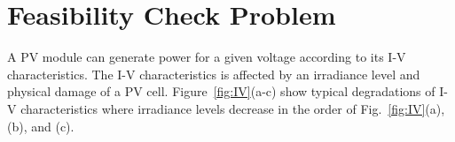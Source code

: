 \documentclass[conference]{IEEEtran}
\begin{document}






\section{Feasibility Check Problem}\label{Sec4}
A PV module can generate power for a given voltage according to its I-V characteristics. The I-V characteristics is affected by an irradiance level and physical damage of a PV cell. Figure~\ref{fig:IV}(a-c) show typical degradations of I-V characteristics where irradiance levels decrease in the order of Fig.~\ref{fig:IV}(a), (b), and (c).
\end{document}
